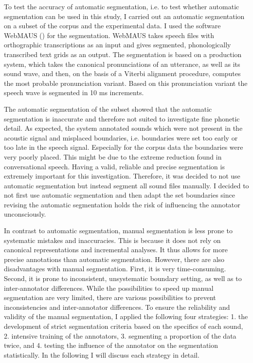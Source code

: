 To test the accuracy of automatic segmentation, i.e. to test whether automatic segmentation can be used in this study, I carried out an automatic segmentation on a subset of the corpus and the experimental data. I used the software WebMAUS (\citealt{Schiel.1999,Kisler.2016}) for the segmentation.  WebMAUS takes speech files with orthographic transcriptions as an input and gives segmented, phonologically transcribed text grids as an output. The segmentation is based on a production system, which takes the canonical pronunciations of an utterance, as well as its sound wave, and then, on the basis of a Viterbi alignment procedure, computes the most probable pronunciation variant. Based on this pronunciation variant the speech wave is segmented in 10 ms increments. 
 \clearpage
 
 The automatic segmentation of the subset showed that the automatic segmentation is inaccurate and therefore not suited to investigate fine phonetic detail. As expected, the system annotated sounds which were not present in the acoustic signal and misplaced boundaries, i.e. boundaries were set too early or too late in the speech signal. Especially for the corpus data the boundaries were very poorly placed. This might be due to the extreme reduction found in conversational speech. 
 Having a valid, reliable and precise segmentation is extremely important for this investigation. Therefore, it was decided to not use automatic segmentation but instead segment all sound files manually. I decided to not first use automatic segmentation and then adapt the set boundaries since revising the automatic segmentation holds the risk of influencing the annotator unconsciously. 
 

In contrast to automatic segmentation, manual segmentation is less prone to systematic mistakes and inaccuracies. This is because it does not rely on canonical representations and incremental analyses. It thus allows for more precise annotations than automatic segmentation.  However, there are also disadvantages with manual segmentation. 
First, it is very time-consuming. Second, it is prone to inconsistent, unsystematic boundary setting, as well as to inter-annotator differences. While the possibilities to speed up manual segmentation are very limited, there are various possibilities to prevent inconsistencies and inter-annotator differences. To ensure the reliability and validity of the manual segmentation, I applied the following four strategies: 1.  the development of strict segmentation criteria based on the specifics of each sound, 2.  intensive training of the annotators, 3. segmenting a proportion of the data twice, and 4. testing the influence of the annotator on the segmentation statistically. In the following I will discuss each strategy in detail.\\


